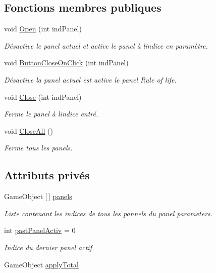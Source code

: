 \subsection*{Fonctions membres publiques}
\begin{DoxyCompactItemize}
\item 
void \mbox{\hyperlink{class_panel_parameters_aec94ac0de16ac853bd93ee2059e65e78}{Open}} (int ind\+Panel)
\begin{DoxyCompactList}\small\item\em Désactive le panel actuel et active le panel à l\textquotesingle{}indice en paramètre. \end{DoxyCompactList}\item 
void \mbox{\hyperlink{class_panel_parameters_aa39f1cebfe55f942b67b3c5c85d89fe8}{Button\+Close\+On\+Click}} (int ind\+Panel)
\begin{DoxyCompactList}\small\item\em Désactive la panel actuel est active le panel Rule of life. \end{DoxyCompactList}\item 
void \mbox{\hyperlink{class_panel_parameters_a649a132c50df46f39a340b3668bddda1}{Close}} (int ind\+Panel)
\begin{DoxyCompactList}\small\item\em Ferme le panel à l\textquotesingle{}indice entré. \end{DoxyCompactList}\item 
void \mbox{\hyperlink{class_panel_parameters_acd85be34f18d47bef829a55a0acd76bf}{Close\+All}} ()
\begin{DoxyCompactList}\small\item\em Ferme tous les panels. \end{DoxyCompactList}\end{DoxyCompactItemize}
\subsection*{Attributs privés}
\begin{DoxyCompactItemize}
\item 
Game\+Object \mbox{[}$\,$\mbox{]} \mbox{\hyperlink{class_panel_parameters_a3acf3dbb1cd826f3c73e8111b5cf8049}{panels}}
\begin{DoxyCompactList}\small\item\em Liste contenant les indices de tous les pannels du panel parameters. \end{DoxyCompactList}\item 
int \mbox{\hyperlink{class_panel_parameters_ad8f000554f0e689f3147268570ab50e7}{past\+Panel\+Activ}} = 0
\begin{DoxyCompactList}\small\item\em Indice du dernier panel actif. \end{DoxyCompactList}\item 
Game\+Object \mbox{\hyperlink{class_panel_parameters_a3adf5d5f6e86c189cace2e20f15e3c95}{apply\+Total}}
\end{DoxyCompactItemize}


